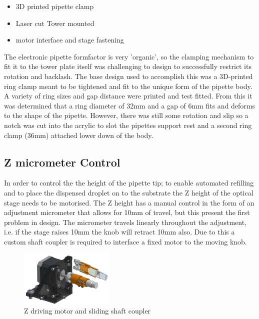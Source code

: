 \begin{itemize}
    \item 3D printed pipette clamp
    \item Laser cut Tower mounted
    \item motor interface and stage fastening
\end{itemize}

The electronic pipette formfactor is very 'organic', so the clamping mechanism to fit it to the tower plate itself was challenging to design to successfully restrict its rotation and backlash.
The base design used to accomplish this was a 3D-printed ring clamp meant to be tightened and fit to the unique form of the pipette body. A variety of ring sizes and gap distance were printed and test fitted. From this it was determined that a ring diameter of 32mm and a gap of 6mm fits and deforms to the shape of the pipette. However, there was still some rotation and slip so a notch was cut into the acrylic to slot the pipettes support rest and a second ring clamp (36mm) attached lower down of the body.

\subsection{Z micrometer Control}

In order to control the the height of the pipette tip; to enable automated refilling and to place the dispensed droplet on to the substrate the Z height of the optical stage needs to be motorised. The Z height has a manual control in the form of an adjustment micrometer that allows for 10mm of travel, but this present the first problem in design.
The micrometer travels linearly throughout the adjustment, i.e. if the stage raises 10mm the knob will retract 10mm also. Due to this a custom shaft coupler is required to interface a fixed motor to the moving knob.

\begin{figure}[h]
    \centering
    \includegraphics[width=0.4\textwidth]{img/z_control.png}
    \caption{Z driving motor and sliding shaft coupler}
    \label{fig:z_coup}
\end{figure}

